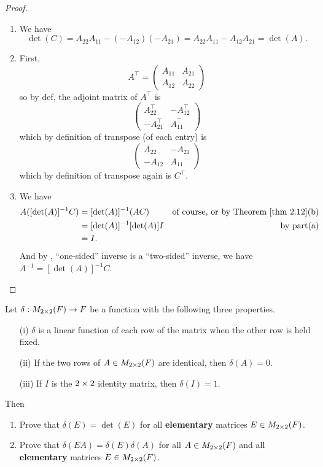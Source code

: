\begin{proof}
\begin{enumerate}
\item
We have
\[
    \det(C) = A_{22}A_{11} - (-A_{12})(-A_{21}) = A_{22} A_{11} - A_{12} A_{21} = \det(A).
\]

\item First,
\[
    A^\top = \begin{pmatrix}
        A_{11} & A_{21} \\
        A_{12} & A_{22}
    \end{pmatrix}
\]
so by def, the adjoint matrix of \(A^\top\) is
\[
    \begin{pmatrix}
        A_{22}^\top & -A_{12}^\top \\
        -A_{21}^\top & A_{11}^\top    
    \end{pmatrix}
\]
which by definition of transpose (of each entry) is
\[
    \begin{pmatrix}
        A_{22} & -A_{21} \\
        -A_{12} & A_{11}
    \end{pmatrix}
\]
which by definition of transpose again is \(C^\top\).

\item
We have
\begin{align*}
    A ([\det(A)]^{-1} C)
    & = [\det(A)]^{-1} (AC) & \text{of course, or by \THM{2.12}(b)} \\
    & = [\det(A)]^{-1} [\det(A)] I & \text{by part(a)} \\
    & = I.
\end{align*}
And by , ``one-sided'' inverse is a ``two-sided'' inverse, we have \(A^{-1} = [\det(A)]^{-1} C\).
\end{enumerate}
\end{proof}

\begin{exercise} \label{exercise 4.1.11}
Let \(\delta: M_{2 \times 2}(F) \to F\) be a function with the following three properties.
\begin{enumerate}
\item[(i)] \(\delta\) is a linear function of each row of the matrix when the other row is held fixed.
\item[(ii)] If the two rows of \(A \in M_{2 \times 2}(F)\) are identical, then \(\delta(A) = 0\).
\item[(iii)] If \(I\) is the \(2 \times 2\) identity matrix, then \(\delta(I) = 1\).
\end{enumerate}

Then
\begin{enumerate}
\item Prove that \(\delta(E) = \det(E)\) for all \textbf{elementary} matrices \(E \in M_{2 \times 2}(F)\).
\item Prove that \(\delta(EA) = \delta(E)\delta(A)\) for all \(A \in M_{2 \times 2}(F)\) and all \textbf{elementary} matrices \(E \in M_{2 \times 2}(F)\).
\end{enumerate}
\end{exercise}

